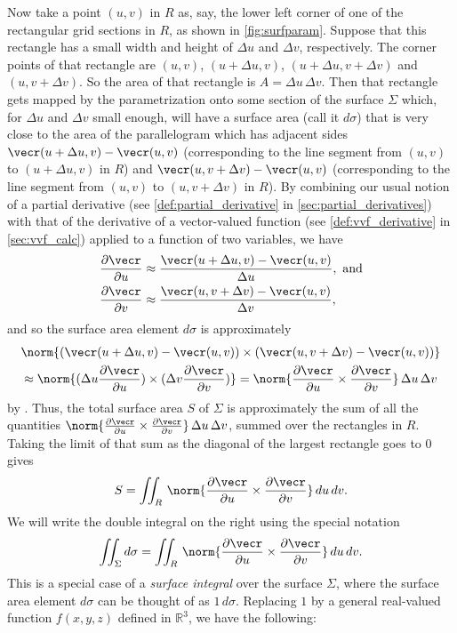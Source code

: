 Now take a point $(u,v)$ in $R$ as, say, the lower left corner of one of the rectangular grid sections in $R$, as shown in \autoref{fig:surfparam}. Suppose that this rectangle has a small width and height of $\Delta u$ and $\Delta v$, respectively. The corner points of that rectangle are $(u,v)$, $(u+\Delta u,v)$, $(u+\Delta u,v+\Delta v)$ and $(u,v+\Delta v)$. So the area of that rectangle is $A = \Delta u\,\Delta v$. Then that rectangle gets mapped by the parametrization onto some section of the surface $\Sigma$ which, for $\Delta u$ and $\Delta v$ small enough, will have a surface area (call it $d\sigma$) that is very close to the area of the parallelogram which has adjacent sides $\vecr(u+\Delta u,v) - \vecr(u,v)$ (corresponding to the line segment from $(u,v)$ to $(u+\Delta u,v)$ in $R$) and $\vecr(u,v+\Delta v) - \vecr(u,v)$ (corresponding to the line segment from $(u,v)$ to $(u,v+\Delta v)$ in $R$). By combining our usual notion of a partial derivative (see \autoref{def:partial_derivative} in \autoref{sec:partial_derivatives}) with that of the derivative of a vector-valued function (see \autoref{def:vvf_derivative} in \autoref{sec:vvf_calc}) applied to a function of two variables, we have
\begin{align*}
 \frac{\partial \vecr}{\partial u} &\approx \frac{\vecr(u+\Delta u,v) - \vecr(u,v)}{\Delta u} ,\text{ and}\vspace{1mm}\\
 \frac{\partial \vecr}{\partial v} &\approx \frac{\vecr(u,v+\Delta v) - \vecr(u,v)}{\Delta v} ,
\end{align*}
and so the surface area element $d\sigma$ is approximately
\begin{multline*}
 \norm{(\vecr(u+\Delta u,v) - \vecr(u,v))\times(\vecr(u,v+\Delta v) - \vecr(u,v))} \\
 \approx
 \norm{(\Delta u \frac{\partial \vecr}{\partial u})\times(\Delta v\frac{\partial \vecr}{\partial v})}
 = \norm{\frac{\partial \vecr}{\partial u}\times\frac{\partial \vecr}{\partial v}}\,
 \Delta u \, \Delta v
\end{multline*}
by . Thus, the total surface area $S$ of $\Sigma$ is approximately the sum of all the quantities $\norm{\frac{\partial \vecr}{\partial u}\times\frac{\partial \vecr}{\partial v}}\,\Delta u\,\Delta v$, summed over the rectangles in $R$. Taking the limit of that sum as the diagonal of the largest rectangle goes to $0$
gives
\[
 S = \iint_{R}\,\norm{\frac{\partial \vecr}{\partial u}\times\frac{\partial \vecr}{\partial v}}
 \,du\,dv .
\]
We will write the double integral on the right using the special notation
\[
 \iint_{\Sigma} d\sigma =
 \iint_{R}\,\norm{\frac{\partial \vecr}{\partial u}\times\frac{\partial \vecr}{\partial v}}
 \,du\,dv .
\]
This is a special case of a \emph{surface integral} over the surface $\Sigma$, where the surface area element $d\sigma$ can be thought of as $1\,d\sigma$. Replacing $1$ by a general real-valued function $f(x,y,z)$ defined in $\mathbb{R}^{3}$, we have the following:

